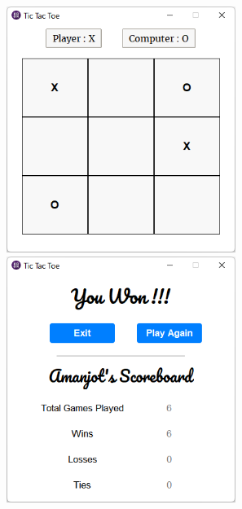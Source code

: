 \includegraphics[height=8cm, width=8cm]{figures/GameBoard_page2.png}
\hfill
\includegraphics[height=8cm, width=8cm]{figures/Result_page_player_win.png}

\vspace{10pt}

